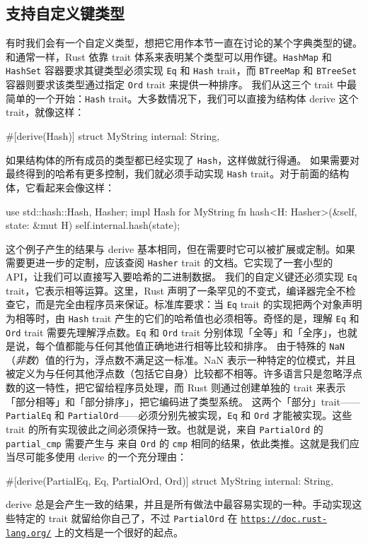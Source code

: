 \subsection{支持自定义键类型}
\label{idx:idx_f85e9fe0}
有时我们会有一个自定义类型，想把它用作本节一直在讨论的某个字典类型的键。和通常一样，Rust 依靠 trait 体系来表明某个类型可以用作键。\texttt{HashMap} 和 \texttt{HashSet} 容器要求其键类型必须实现 \texttt{Eq} 和
\texttt{Hash} trait，而 \texttt{BTreeMap} 和 \texttt{BTreeSet}
容器则要求该类型通过指定 \texttt{Ord} trait 来提供一种排序。
我们从这三个 trait 中最简单的一个开始：\texttt{Hash} trait。大多数情况下，我们可以直接为结构体 derive 这个 trait，就像这样：
\begin{codebox}[rust]
#[derive(Hash)]
struct MyString {
    internal: String,
}
\end{codebox}
\label{idx:idx_476f9ec8}
如果结构体的所有成员的类型都已经实现了 \texttt{Hash}，这样做就行得通。
如果需要对最终得到的哈希有更多控制，我们就必须手动实现 \texttt{Hash} trait。对于前面的结构体，它看起来会像这样：
\begin{codebox}[rust]
use std::hash::{Hash, Hasher};
impl Hash for MyString {
    fn hash<H: Hasher>(&self, state: &mut H) {
        self.internal.hash(state);
    }
}
\end{codebox}
这个例子产生的结果与 derive 基本相同，但在需要时它可以被扩展或定制。如果需要更进一步的定制，应该查阅 \texttt{Hasher} trait 的文档。它实现了一套小型的 API，让我们可以直接写入要哈希的二进制数据。
我们的自定义键还必须实现 \texttt{Eq} trait，它表示相等运算。这里，Rust 声明了一条罕见的不变式，编译器完全不检查它，而是完全由程序员来保证。标准库要求：当 \texttt{Eq} trait 的实现把两个对象声明为相等时，由 \texttt{Hash} trait 产生的它们的哈希值也必须相等。奇怪的是，理解 \texttt{Eq} 和 \texttt{Ord} trait 需要先理解浮点数。\texttt{Eq} 和 \texttt{Ord} trait 分别体现「全等」和「全序」，也就是说，每个值都能与任何其他值正确地进行相等比较和排序。
由于特殊的 \texttt{NaN}（\emph{非数}）值的行为，浮点数不满足这一标准。NaN 表示一种特定的位模式，并且被定义为与任何其他浮点数（包括它自身）比较都不相等。许多语言只是忽略浮点数的这一特性，把它留给程序员处理，而 Rust 则通过创建单独的 trait 来表示「部分相等」和「部分排序」，把它编码进了类型系统。
\label{idx:idx_d3deadd6}
这两个「部分」trait——\texttt{PartialEq} 和 \texttt{PartialOrd}——必须分别先被实现，\texttt{Eq} 和 \texttt{Ord} 才能被实现。这些 trait 的所有实现彼此之间必须保持一致。也就是说，来自 \texttt{PartialOrd} 的 \texttt{partial\_\allowbreak{}cmp} 需要产生与
来自 \texttt{Ord} 的 \texttt{cmp} 相同的结果，依此类推。这就是我们应当尽可能多使用 derive 的一个充分理由：
\begin{codebox}[rust]
#[derive(PartialEq, Eq, PartialOrd, Ord)]
struct MyString {
    internal: String,
}
\end{codebox}
derive 总是会产生一致的结果，并且是所有做法中最容易实现的一种。手动实现这些特定的 trait 就留给你自己了，不过 \texttt{PartialOrd} 在 \href{https://doc.rust-lang.org/}{\texttt{https:/\allowbreak{}/\allowbreak{}doc.\allowbreak{}rust-\allowbreak{}lang.\allowbreak{}org/\allowbreak{}}} 上的文档是一个很好的起点。
